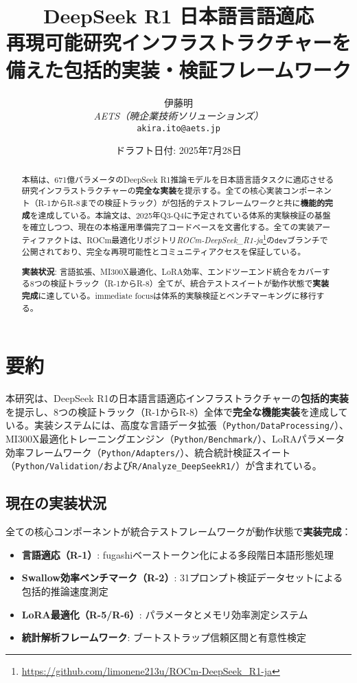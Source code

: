 \documentclass[12pt,a4paper]{article}
\title{\textbf{DeepSeek R1 日本語言語適応}\\
\large 再現可能研究インフラストラクチャーを備えた包括的実装・検証フレームワーク}
\author{
伊藤明\\
\textit{AETS（暁企業技術ソリューションズ）}\\
\texttt{akira.ito@aets.jp}
}
\date{ドラフト日付: 2025年7月28日}
\begin{document}
\maketitle

\begin{abstract}
本稿は、671億パラメータのDeepSeek R1推論モデルを日本語言語タスクに適応させる研究インフラストラクチャーの\textbf{完全な実装}を提示する。全ての核心実装コンポーネント（R-1からR-8までの検証トラック）が包括的テストフレームワークと共に\textbf{機能的完成}を達成している。本論文は、2025年Q3-Q4に予定されている体系的実験検証の基盤を確立しつつ、現在の本格運用準備完了コードベースを文書化する。全ての実装アーティファクトは、ROCm最適化リポジトリ\textit{ROCm-DeepSeek\_R1-ja}\footnote{\url{https://github.com/limonene213u/ROCm-DeepSeek_R1-ja}}の\texttt{dev}ブランチで公開されており、完全な再現可能性とコミュニティアクセスを保証している。

\textbf{実装状況}: 言語拡張、MI300X最適化、LoRA効率、エンドツーエンド統合をカバーする8つの検証トラック（R-1からR-8）全てが、統合テストスイートが動作状態で\textbf{実装完成}に達している。immediate focusは体系的実験検証とベンチマーキングに移行する。
\end{abstract}

\tableofcontents
\newpage

\section{要約}

本研究は、DeepSeek R1の日本語言語適応インフラストラクチャーの\textbf{包括的実装}を提示し、8つの検証トラック（R-1からR-8）全体で\textbf{完全な機能実装}を達成している。実装システムには、高度な言語データ拡張（\texttt{Python/DataProcessing/}）、MI300X最適化トレーニングエンジン（\texttt{Python/Benchmark/}）、LoRAパラメータ効率フレームワーク（\texttt{Python/Adapters/}）、統合統計検証スイート（\texttt{Python/Validation/}および\texttt{R/Analyze\_DeepSeekR1/}）が含まれている。

\subsection{現在の実装状況}

全ての核心コンポーネントが統合テストフレームワークが動作状態で\textbf{実装完成}：

\begin{itemize}
\item \textbf{言語適応（R-1）}: fugashiベーストークン化による多段階日本語形態処理
\item \textbf{Swallow効率ベンチマーク（R-2）}: 31プロンプト検証データセットによる包括的推論速度測定
\item \textbf{LoRA最適化（R-5/R-6）}: パラメータとメモリ効率測定システム
\item \textbf{統計解析フレームワーク}: ブートストラップ信頼区間と有意性検定
\end{itemize}
\end{document}
